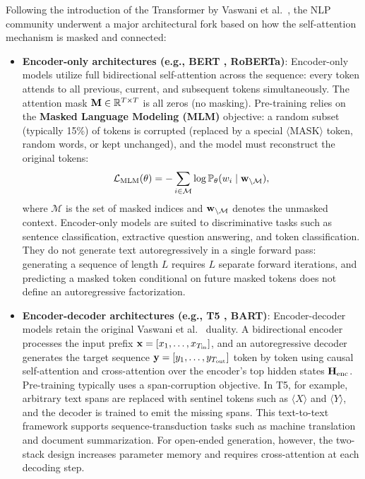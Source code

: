 \documentclass[../../main.tex]{subfiles}
\begin{document}
Following the introduction of the Transformer by Vaswani et al.~\cite{vaswani2017}, the NLP community underwent a major architectural fork based on how the self-attention mechanism is masked and connected:
\begin{itemize}
    \item \textbf{Encoder-only architectures (e.g., BERT \cite{devlin2019}, RoBERTa)}:
    Encoder-only models utilize full bidirectional self-attention across the sequence: every token attends to all previous, current, and subsequent tokens simultaneously. The attention mask $\mathbf{M} \in \mathbb{R}^{T \times T}$ is all zeros (no masking). 
    Pre-training relies on the \textbf{Masked Language Modeling (MLM)} objective: a random subset (typically 15\%) of tokens is corrupted (replaced by a special $\langle\text{MASK}\rangle$ token, random words, or kept unchanged), and the model must reconstruct the original tokens:
    \begin{equation}
    \label{eq:mlm_loss}
    \mathcal{L}_{\text{MLM}}(\theta) = -\sum_{i \in \mathcal{M}} \log \mathbb{P}_\theta(w_i \mid \mathbf{w}_{\setminus \mathcal{M}}),
    \end{equation}
    where $\mathcal{M}$ is the set of masked indices and $\mathbf{w}_{\setminus \mathcal{M}}$ denotes the unmasked context. Encoder-only models are suited to discriminative tasks such as sentence classification, extractive question answering, and token classification. They do not generate text autoregressively in a single forward pass: generating a sequence of length $L$ requires $L$ separate forward iterations, and predicting a masked token conditional on future masked tokens does not define an autoregressive factorization.
    
    \item \textbf{Encoder-decoder architectures (e.g., T5 \cite{raffel2020t5}, BART)}:
    Encoder-decoder models retain the original Vaswani et al.~\cite{vaswani2017} duality. A bidirectional encoder processes the input prefix $\mathbf{x} = [x_1, \dots, x_{T_{\text{in}}}]$, and an autoregressive decoder generates the target sequence $\mathbf{y} = [y_1, \dots, y_{T_{\text{out}}}]$ token by token using causal self-attention and cross-attention over the encoder's top hidden states $\mathbf{H}_{\text{enc}}$.
    Pre-training typically uses a span-corruption objective. In T5, for example, arbitrary text spans are replaced with sentinel tokens such as $\langle X \rangle$ and $\langle Y \rangle$, and the decoder is trained to emit the missing spans. This text-to-text framework supports sequence-transduction tasks such as machine translation and document summarization. For open-ended generation, however, the two-stack design increases parameter memory and requires cross-attention at each decoding step.
    

\end{itemize}
\end{document}
